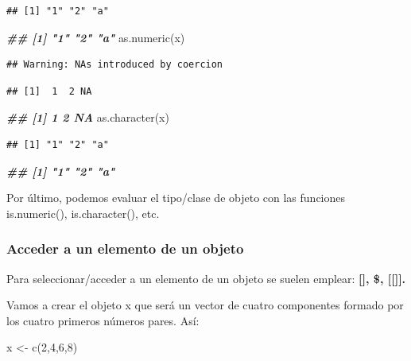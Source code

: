 \documentclass[
]{book}
\newenvironment{Shaded}{\begin{snugshade}}{\end{snugshade}}
\newcommand{\DecValTok}[1]{\textcolor[rgb]{0.00,0.00,0.81}{#1}}
\newcommand{\DocumentationTok}[1]{\textcolor[rgb]{0.56,0.35,0.01}{\textbf{\textit{#1}}}}
\newcommand{\FunctionTok}[1]{\textcolor[rgb]{0.00,0.00,0.00}{#1}}
\newcommand{\NormalTok}[1]{#1}
\newcommand{\OtherTok}[1]{\textcolor[rgb]{0.56,0.35,0.01}{#1}}
\begin{document}
\begin{verbatim}
## [1] "1" "2" "a"
\end{verbatim}

\begin{Shaded}
\begin{Highlighting}[]
\DocumentationTok{\#\# [1] "1" "2" "a"}
\FunctionTok{as.numeric}\NormalTok{(x)}
\end{Highlighting}
\end{Shaded}

\begin{verbatim}
## Warning: NAs introduced by coercion
\end{verbatim}

\begin{verbatim}
## [1]  1  2 NA
\end{verbatim}

\begin{Shaded}
\begin{Highlighting}[]
\DocumentationTok{\#\# [1]  1  2 NA}
\FunctionTok{as.character}\NormalTok{(x)}
\end{Highlighting}
\end{Shaded}

\begin{verbatim}
## [1] "1" "2" "a"
\end{verbatim}

\begin{Shaded}
\begin{Highlighting}[]
\DocumentationTok{\#\# [1] "1" "2" "a"}
\end{Highlighting}
\end{Shaded}

Por último, podemos evaluar el tipo/clase de objeto con las funciones is.numeric(), is.character(), etc.

\hypertarget{acceder-a-un-elemento-de-un-objeto}{%
\subsubsection{Acceder a un elemento de un objeto}\label{acceder-a-un-elemento-de-un-objeto}}

Para seleccionar/acceder a un elemento de un objeto se suelen emplear: \textbf{{[}{]}, \$, {[}{[}{]}{]}.}

Vamos a crear el objeto x que será un vector de cuatro componentes formado por los cuatro primeros números pares. Así:

\begin{Shaded}
\begin{Highlighting}[]
\NormalTok{x }\OtherTok{\textless{}{-}} \FunctionTok{c}\NormalTok{(}\DecValTok{2}\NormalTok{,}\DecValTok{4}\NormalTok{,}\DecValTok{6}\NormalTok{,}\DecValTok{8}\NormalTok{)}
\end{Highlighting}
\end{Shaded}
\end{document}
